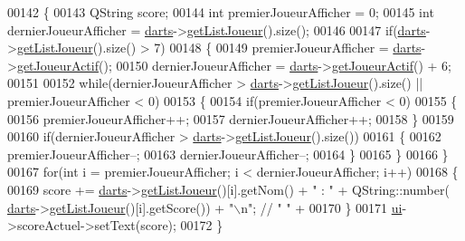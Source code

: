 \begin{DoxyCode}
00142 \{
00143     QString score;
00144     \textcolor{keywordtype}{int} premierJoueurAfficher = 0;
00145     \textcolor{keywordtype}{int} dernierJoueurAfficher = \hyperlink{class_ihm_a2a0f54d33f4d6b2531ec2190c4a2356e}{darts}->\hyperlink{class_darts_a0525b09703d3461bf5570197354743c3}{getListJoueur}().size();
00146 
00147     \textcolor{keywordflow}{if}(\hyperlink{class_ihm_a2a0f54d33f4d6b2531ec2190c4a2356e}{darts}->\hyperlink{class_darts_a0525b09703d3461bf5570197354743c3}{getListJoueur}().size() > 7)
00148     \{
00149         premierJoueurAfficher = \hyperlink{class_ihm_a2a0f54d33f4d6b2531ec2190c4a2356e}{darts}->\hyperlink{class_darts_a20ddfd28c8355c06a90cc23abff3de11}{getJoueurActif}();
00150         dernierJoueurAfficher = \hyperlink{class_ihm_a2a0f54d33f4d6b2531ec2190c4a2356e}{darts}->\hyperlink{class_darts_a20ddfd28c8355c06a90cc23abff3de11}{getJoueurActif}() + 6;
00151 
00152         \textcolor{keywordflow}{while}(dernierJoueurAfficher > \hyperlink{class_ihm_a2a0f54d33f4d6b2531ec2190c4a2356e}{darts}->\hyperlink{class_darts_a0525b09703d3461bf5570197354743c3}{getListJoueur}().size() || 
      premierJoueurAfficher < 0)
00153         \{
00154             \textcolor{keywordflow}{if}(premierJoueurAfficher < 0)
00155             \{
00156                 premierJoueurAfficher++;
00157                 dernierJoueurAfficher++;
00158             \}
00159 
00160             \textcolor{keywordflow}{if}(dernierJoueurAfficher > \hyperlink{class_ihm_a2a0f54d33f4d6b2531ec2190c4a2356e}{darts}->\hyperlink{class_darts_a0525b09703d3461bf5570197354743c3}{getListJoueur}().size())
00161             \{
00162                 premierJoueurAfficher--;
00163                 dernierJoueurAfficher--;
00164             \}
00165         \}
00166     \}
00167     \textcolor{keywordflow}{for}(\textcolor{keywordtype}{int} i = premierJoueurAfficher; i < dernierJoueurAfficher; i++)
00168     \{
00169         score += \hyperlink{class_ihm_a2a0f54d33f4d6b2531ec2190c4a2356e}{darts}->\hyperlink{class_darts_a0525b09703d3461bf5570197354743c3}{getListJoueur}()[i].getNom() + \textcolor{stringliteral}{" : "} + QString::number(
      \hyperlink{class_ihm_a2a0f54d33f4d6b2531ec2190c4a2356e}{darts}->\hyperlink{class_darts_a0525b09703d3461bf5570197354743c3}{getListJoueur}()[i].getScore()) + \textcolor{stringliteral}{"\(\backslash\)n"}; \textcolor{comment}{// "         " +}
00170     \}
00171     \hyperlink{class_ihm_a0ac5f47856566ceeeca1720109bf70ea}{ui}->scoreActuel->setText(score);
00172 \}
\end{DoxyCode}
\mbox{\label{class_ihm_a27b24d133887431399b4696a4eae02e6}} 
